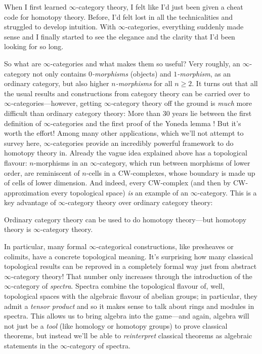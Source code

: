 \documentclass[DIV=12,numbers=enddot,leqno,bibliography=totoc]{scrartcl}
\begin{document}
	\begin{numpar}
		When I first learned $\infty$-category theory, I felt like I'd just been given a cheat code for homotopy theory. Before, I'd felt lost in all the technicalities and struggled to develop intuition. With $\infty$-categories, everything suddenly made sense and I finally started to see the elegance and the clarity that I'd been looking for so long.
		
		So what are $\infty$-categories and what makes them so useful? Very roughly, an $\infty$-category not only contains \emph{$0$-morphisms} (objects) and \emph{$1$-morphism}, as an ordinary category, but also higher \emph{$n$-morphisms} for all $n\geqslant 2$. It turns out that all the usual results and constructions from category theory can be carried over to $\infty$-categories---however, getting $\infty$-category theory off the ground is \emph{much} more difficult than ordinary category theory: More than 30 years lie between the first definition of $\infty$-categories \cite{BoardmanVogt} and the first proof of the Yoneda lemma \cite{HTT}! But it's worth the effort! Among many other applications, which we'll not attempt to survey here, $\infty$-categories provide an incredibly powerful framework to do homotopy theory in. Already the vague idea explained above has a topological flavour: $n$-morphisms in an $\infty$-category, which run between morphisms of lower order, are reminiscent of $n$-cells in a CW-complexes, whose boundary is made up of cells of lower dimension. And indeed, every CW-complex (and then by CW-approximation every topological space) \emph{is} an example of an $\infty$-category. This is a key advantage of $\infty$-category theory over ordinary category theory:
		\begin{alphanumerate}[label={}]\itshape
			\item Ordinary category theory can be used to do homotopy theory---but homotopy theory is $\infty\text{-}$category theory.
		\end{alphanumerate}
		In particular, many formal $\infty$-categorical constructions, like presheaves or colimits, have a concrete topological meaning. It's surprising how many classical topological results can be reproved in a completely formal way just from abstract $\infty$-category theory! That number only increases through the introduction of the $\infty$-category of \emph{spectra}. Spectra combine the topological flavour of, well, topological spaces with the algebraic flavour of abelian groups; in particular, they admit a \emph{tensor product} and so it makes sense to talk about rings and modules in spectra. This allows us to bring algebra into the game---and again, algebra will not just be a \emph{tool} (like homology or homotopy groups) to prove classical theorems, but instead we'll be able to \emph{reinterpret} classical theorems as algebraic statements in the $\infty$-category of spectra.
		

\end{numpar}
\end{document}
